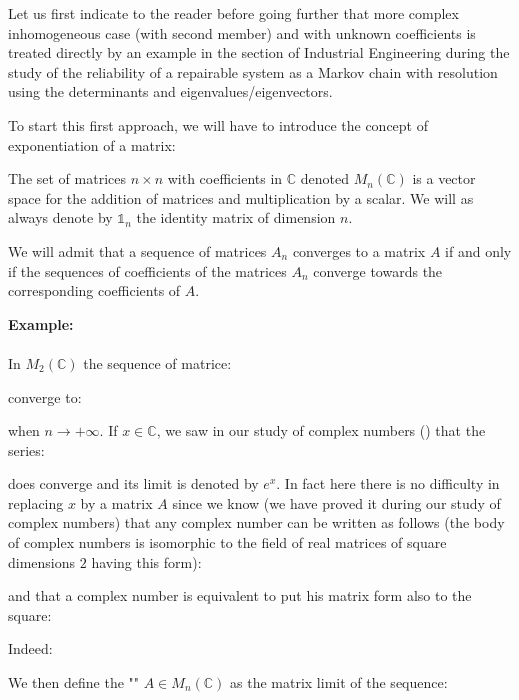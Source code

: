 	Let us first indicate to the reader before going further that more complex inhomogeneous case (with second member) and with unknown coefficients is treated directly by an example in the section of Industrial Engineering during the study of the reliability of a repairable system as a Markov chain with resolution using the determinants and eigenvalues/eigenvectors.
	
	To start this first approach, we will have to introduce the concept of exponentiation of a matrix:

	The set of matrices $n \times n$ with coefficients in $\mathbb{C}$ denoted $M_n(\mathbb{C})$ is a vector space for the addition of matrices and multiplication by a scalar. We will as always denote by $\mathds{1}_n$ the identity matrix of dimension $n$.
	
	We will admit that a sequence of matrices $A_n$ converges to a matrix $A$ if and only if the sequences of coefficients of the matrices $A_n$ converge towards the corresponding coefficients of $A$.
	
	\begin{tcolorbox}[colframe=black,colback=white,sharp corners]
	\textbf{{\Large {}}Example:}\\\\
	In $M_2(\mathbb{C})$ the sequence of matrice:
	
	converge to:
	
	when $n\rightarrow +\infty$.
	If $x\in \mathbb{C}$, we saw in our study of complex numbers () that the series:	
	
	does converge and its limit is denoted by $e^x$. In fact here there is no difficulty in replacing $x$ by a matrix $A$ since we know (we have proved it during our study of complex numbers) that any complex number can be written as follows (the body of complex numbers is isomorphic to the field of real matrices of square dimensions $2$ having this form):
	
	\end{tcolorbox}
	\pagebreak
	\begin{tcolorbox}[colframe=black,colback=white,sharp corners]
	and that a complex number is equivalent to put his matrix form also to the square:
	
	Indeed:
	
	\end{tcolorbox}
	We then define the "\label{exponential of a matrix}" $A\in M_n(\mathbb{C})$ as the matrix limit of the sequence:
	

